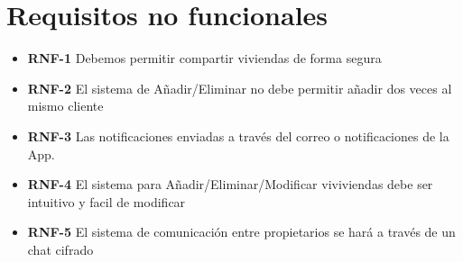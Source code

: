 \section{Requisitos no funcionales}
\begin{itemize}
\item \textbf{RNF-1} Debemos permitir compartir viviendas de forma segura 
\item \textbf{RNF-2} El sistema de Añadir/Eliminar no debe permitir añadir dos veces al mismo cliente
\item \textbf{RNF-3} Las notificaciones enviadas a través del correo o notificaciones de la App.
\item \textbf{RNF-4} El sistema para Añadir/Eliminar/Modificar viviviendas debe ser intuitivo y facil de modificar
\item \textbf{RNF-5} El sistema de comunicación entre propietarios se hará a través de un chat cifrado
\end{itemize}
